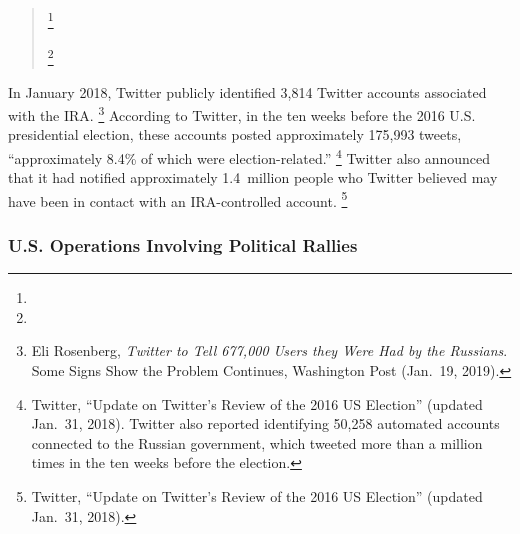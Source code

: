 \begin{quote}

\footnote{}

\footnote{}

\end{quote}

In January 2018, Twitter publicly identified 3,814 Twitter accounts associated with the IRA\null.%
\footnote{Eli Rosenberg, \textit{Twitter to Tell 677,000 Users they Were Had by the Russians}.
Some Signs Show the Problem Continues, Washington Post (Jan.~19, 2019).}
According to Twitter, in the ten weeks before the 2016 U.S. presidential election, these accounts posted approximately 175,993 tweets, ``approximately 8.4\% of which were election-related.''%
\footnote{Twitter, ``Update on Twitter's Review of the 2016 US Election'' (updated Jan.~31, 2018).
Twitter also reported identifying 50,258 automated accounts connected to the Russian government, which tweeted more than a million times in the ten weeks before the election.}
Twitter also announced that it had notified approximately 1.4~million people who Twitter believed may have been in contact with an IRA-controlled account.%
\footnote{Twitter, ``Update on Twitter's Review of the 2016 US Election'' (updated Jan.~31, 2018).}

\subsubsection{U.S. Operations Involving Political Rallies}

